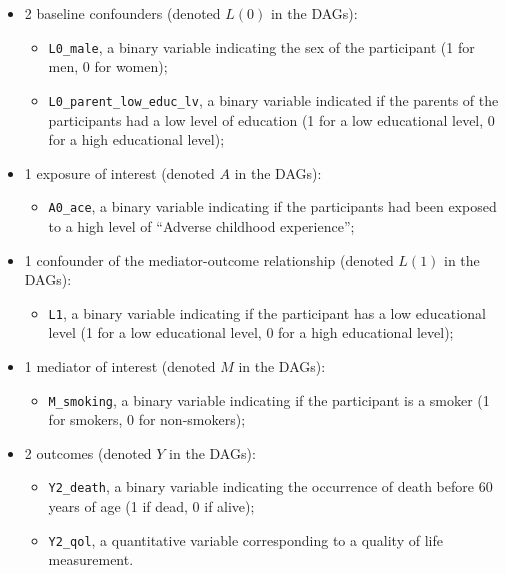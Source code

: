 \documentclass[
]{book}
\providecommand{\tightlist}{%
  \setlength{\itemsep}{0pt}\setlength{\parskip}{0pt}}
\begin{document}
\begin{itemize}
\tightlist
\item
  2 baseline confounders (denoted \(L(0)\) in the DAGs):

  \begin{itemize}
  \tightlist
  \item
    \texttt{L0\_male}, a binary variable indicating the sex of the participant (1 for men, 0 for women);
  \item
    \texttt{L0\_parent\_low\_educ\_lv}, a binary variable indicated if the parents of the participants had a low level of education (1 for a low educational level, 0 for a high educational level);
  \end{itemize}
\item
  1 exposure of interest (denoted \(A\) in the DAGs):

  \begin{itemize}
  \tightlist
  \item
    \texttt{A0\_ace}, a binary variable indicating if the participants had been exposed to a high level of ``Adverse childhood experience'';
  \end{itemize}
\item
  1 confounder of the mediator-outcome relationship (denoted \(L(1)\) in the DAGs):

  \begin{itemize}
  \tightlist
  \item
    \texttt{L1}, a binary variable indicating if the participant has a low educational level (1 for a low educational level, 0 for a high educational level);
  \end{itemize}
\item
  1 mediator of interest (denoted \(M\) in the DAGs):

  \begin{itemize}
  \tightlist
  \item
    \texttt{M\_smoking}, a binary variable indicating if the participant is a smoker (1 for smokers, 0 for non-smokers);
  \end{itemize}
\item
  2 outcomes (denoted \(Y\) in the DAGs):

  \begin{itemize}
  \tightlist
  \item
    \texttt{Y2\_death}, a binary variable indicating the occurrence of death before 60 years of age (1 if dead, 0 if alive);
  \item
    \texttt{Y2\_qol}, a quantitative variable corresponding to a quality of life measurement.
  \end{itemize}
\end{itemize}
\end{document}
